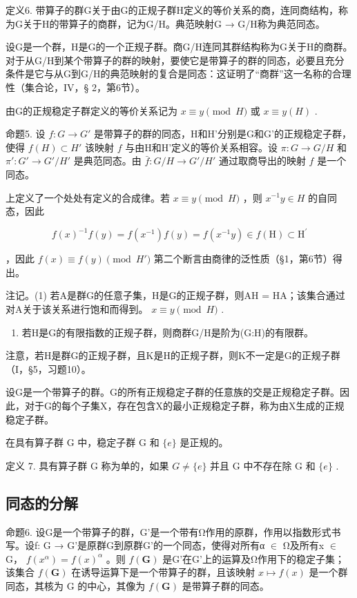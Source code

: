 定义6. 带算子的群G关于由G的正规子群H定义的等价关系的商，连同商结构，称为G关于H的带算子的商群，记为G/H。典范映射G → G/H称为典范同态。

设G是一个群，H是G的一个正规子群。商G/H连同其群结构称为G关于H的商群。对于从G/H到某个带算子的群的映射，要使它是带算子的群的同态，必要且充分条件是它与从G到G/H的典范映射的复合是同态：这证明了“商群”这一名称的合理性（集合论，IV，§ 2，第6节）。

由G的正规稳定子群定义的等价关系记为 \(x \equiv y \pmod{H}\) 或 \(x \equiv y(H)\) .

命题5. 设 \(f: G \to G'\) 是带算子的群的同态，H和H'分别是G和G'的正规稳定子群，使得 \(f(H) \subset H'\) 该映射 \(f\) 与由H和H'定义的等价关系相容。设 \(\pi: G \to G/H\) 和 \(\pi': G' \to G'/H'\) 是典范同态。由 \(\bar{f}: G/H \to G'/H'\) 通过取商导出的映射 \(f\) 是一个同态。

上定义了一个处处有定义的合成律。若 \(x \equiv y \pmod{H}\) ，则 \(x^{-1}y \in H\) 的自同态，因此

\[
f (x) ^ {- 1} f (y) = f \left(x ^ {- 1}\right) f (y) = f \left(x ^ {- 1} y\right) \in f (\mathrm{H}) \subset \mathrm{H} ^ {\prime}
\]

，因此 \(f(x) \equiv f(y) \pmod{H'}\) 第二个断言由商律的泛性质（§1，第6节）得出。

注记。(1) 若A是群G的任意子集，H是G的正规子群，则AH = HA；该集合通过对A关于该关系进行饱和而得到。 \(x \equiv y \pmod{H}\) .

\begin{enumerate}
\def\labelenumi{(\arabic{enumi})}
\setcounter{enumi}{1}
\tightlist
\item
  若H是G的有限指数的正规子群，则商群G/H是阶为(G:H)的有限群。
\end{enumerate}

注意，若H是群G的正规子群，且K是H的正规子群，则K不一定是G的正规子群（I，§5，习题10）。

设G是一个带算子的群。G的所有正规稳定子群的任意族的交是正规稳定子群。因此，对于G的每个子集X，存在包含X的最小正规稳定子群，称为由X生成的正规稳定子群。

在具有算子群 G 中，稳定子群 G 和 \(\{e\}\) 是正规的。

定义 7. 具有算子群 G 称为单的，如果 \(G \neq \{e\}\) 并且 G 中不存在除 G 和 \(\{e\}\) .

\subsection{同态的分解}

命题6. 设G是一个带算子的群，G'是一个带有Ω作用的原群，作用以指数形式书写。设f: G → G'是原群G到原群G'的一个同态，使得对所有α \ensuremath{\in} Ω及所有x \ensuremath{\in} G， \(f(x^{\alpha}) = f(x)^{\alpha}\) 。则 \(f(\mathbf{G})\) 是G'在G'上的运算及Ω作用下的稳定子集；该集合 \(f(\mathbf{G})\) 在诱导运算下是一个带算子的群，且该映射 \(x \mapsto f(x)\) 是一个群同态，其核为 G 的中心，其像为 \(f(\mathbf{G})\) 是带算子群的同态。

